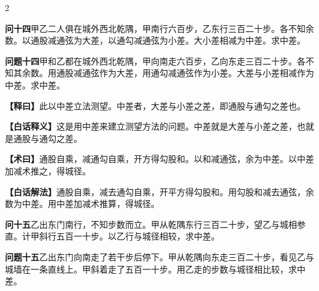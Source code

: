 \documentclass[11pt,a4paper]{article}
\newcommand{\WenQuestion}[1]{\textbf{\textcolor{classicalcolor}{#1}}}
\newcommand{\BaiQuestion}[1]{\textbf{\textcolor{moderncolor}{#1}}}
\newcommand{\WenExplain}{\textcolor{classicalcolor}{\textbf{【释曰】}}}
\newcommand{\BaiExplain}{\textcolor{moderncolor}{\textbf{【白话释义】}}}
\newcommand{\WenMethod}{\textcolor{classicalcolor}{\textbf{【术曰】}}}
\newcommand{\BaiMethod}{\textcolor{moderncolor}{\textbf{【白话解法】}}}
\begin{document}
\vspace{0.5em}

\begin{paracol}{2}

\switchcolumn*
\begin{tcolorbox}[colback=red!3,colframe=red!30!black,boxrule=0.3pt]
\WenQuestion{问十四}\quad 甲乙二人俱在城外西北乾隅，甲南行六百步，乙东行三百二十步。各不知余数。以通股减通弦为大差，以通勾减通弦为小差。大小差相减为中差。求中差。
\end{tcolorbox}
\switchcolumn
\begin{tcolorbox}[colback=blue!3,colframe=blue!30!black,boxrule=0.3pt]
\BaiQuestion{问题十四}\quad 甲和乙都在城外西北乾隅，甲向南走六百步，乙向东走三百二十步。各不知其余数。用通股减通弦作为大差，用通勾减通弦作为小差。大差与小差相减作为中差。求中差。
\end{tcolorbox}

\switchcolumn*
\begin{tcolorbox}[colback=red!5,colframe=red!30!black,boxrule=0.3pt]
\WenExplain\quad 此以中差立法测望。中差者，大差与小差之差，即通股与通勾之差也。
\end{tcolorbox}
\switchcolumn
\begin{tcolorbox}[colback=blue!5,colframe=blue!30!black,boxrule=0.3pt]
\BaiExplain\quad 这是用中差来建立测望方法的问题。中差就是大差与小差之差，也就是通股与通勾之差。
\end{tcolorbox}

\switchcolumn*
\begin{tcolorbox}[colback=red!5,colframe=red!40!black,boxrule=0.3pt]
\WenMethod\quad 通股自乘，减通勾自乘，开方得勾股和。以和减通弦，余为中差。以中差加减术推之，得城径。
\end{tcolorbox}
\switchcolumn
\begin{tcolorbox}[colback=blue!5,colframe=blue!40!black,boxrule=0.3pt]
\BaiMethod\quad 通股自乘，减去通勾自乘，开平方得勾股和。用勾股和减去通弦，余数为中差。用中差加减术推算，得城径。
\end{tcolorbox}

\vspace{0.8em}

\switchcolumn*
\begin{tcolorbox}[colback=red!3,colframe=red!30!black,boxrule=0.3pt]
\WenQuestion{问十五}\quad 乙出东门南行，不知步数而立。甲从乾隅东行三百二十步，望乙与城相参直。计甲斜行五百一十步。以乙行与城径相较，求中差。
\end{tcolorbox}
\switchcolumn
\begin{tcolorbox}[colback=blue!3,colframe=blue!30!black,boxrule=0.3pt]
\BaiQuestion{问题十五}\quad 乙出东门向南走了若干步后停下。甲从乾隅向东走三百二十步，看见乙与城墙在一条直线上。甲斜着走了五百一十步。用乙走的步数与城径相比较，求中差。
\end{tcolorbox}


\end{paracol}
\end{document}
